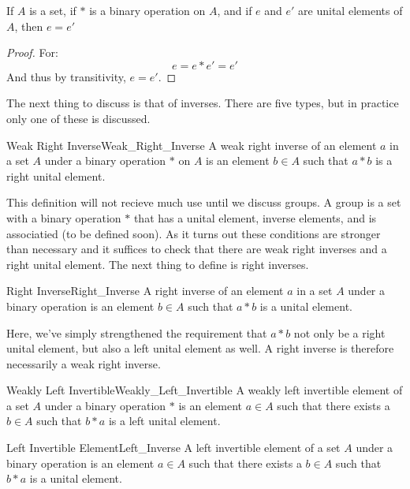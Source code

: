     \begin{theorem}
        \label{thm:Unital_Elements_are_Unique}%
        If $A$ is a set, if $*$ is a binary operation on $A$, and if $e$ and
        $e'$ are unital elements of $A$, then $e=e'$
    \end{theorem}
    \begin{proof}
        For:
        \begin{equation}
            e=e*e'=e'
        \end{equation}
        And thus by transitivity, $e=e'$.
    \end{proof}
    The next thing to discuss is that of inverses. There are five types, but in
    practice only one of these is discussed.
    \begin{fdefinition}{Weak Right Inverse}{Weak_Right_Inverse}
        A weak right inverse of an element $a$ in a \gls{set} $A$ under a
        \gls{binary operation} $*$ on $A$ is an element $b\in{A}$ such that
        $a*b$ is a right unital element.
    \end{fdefinition}
    This definition will not recieve much use until we discuss
    groups. A group is a set with a binary operation $*$ that has
    a unital element, inverse elements, and is associatied (to be defined soon).
    As it turns out these conditions are stronger than necessary and it suffices
    to check that there are weak right inverses and a right unital element. The
    next thing to define is right inverses.
    \begin{fdefinition}{Right Inverse}{Right_Inverse}
        A right inverse of an element $a$ in a \gls{set} $A$ under a
        \gls{binary operation} is an element $b\in{A}$ such that $a*b$ is a
        \gls{unital element}.
    \end{fdefinition}
    Here, we've simply strengthened the requirement that $a*b$ not only be a
    right unital element, but also a left unital element as well. A right
    inverse is therefore necessarily a weak right inverse.
    \begin{fdefinition}{Weakly Left Invertible}{Weakly_Left_Invertible}
        A weakly left invertible element of a \gls{set} $A$ under a
        \gls{binary operation} $*$ is an element $a\in{A}$ such that there
        exists a $b\in{A}$ such that $b*a$ is a left unital element.
    \end{fdefinition}
    \begin{fdefinition}{Left Invertible Element}{Left_Inverse}
        A left invertible element of a \gls{set} $A$ under a
        \gls{binary operation} is an element $a\in{A}$ such that there exists a
        $b\in{A}$ such that $b*a$ is a \gls{unital element}.
    \end{fdefinition}
